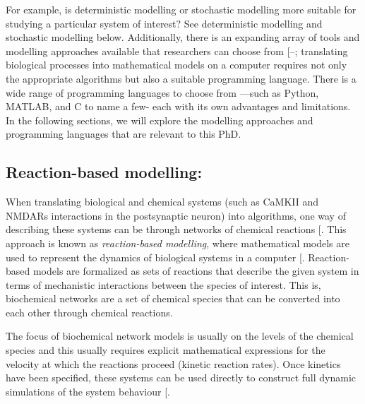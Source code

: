 \documentclass[
  11pt,
  letterpaper,
]{scrreprt}
\begin{document}
For example, is deterministic modelling or stochastic modelling more
suitable for studying a particular system of interest? See deterministic
modelling and stochastic modelling below. Additionally, there is an
expanding array of tools and modelling approaches available that
researchers can choose from
{[}--\citeproc{ref-kohl2011Standards}{266}{]};
translating biological processes into mathematical models on a computer
requires not only the appropriate algorithms but also a suitable
programming language. There is a wide range of programming languages to
choose from ---such as Python, MATLAB, and C to name a few- each with
its own advantages and limitations. In the following sections, we will
explore the modelling approaches and programming languages that are
relevant to this PhD.

\subsection*{Reaction-based modelling:}\label{reaction-based-modelling}

When translating biological and chemical systems (such as CaMKII and
NMDARs interactions in the postsynaptic neuron) into algorithms, one way
of describing these systems can be through networks of chemical
reactions {[}\citeproc{ref-cook2009Programmability}{267}{]}. This
approach is known as \emph{reaction-based modelling}, where mathematical
models are used to represent the dynamics of biological systems in a
computer {[}\citeproc{ref-besozzi2016ReactionBased}{268}{]}.
Reaction-based models are formalized as sets of reactions that describe
the given system in terms of mechanistic interactions between the
species of interest. This is, biochemical networks are a set of chemical
species that can be converted into each other through chemical
reactions.

The focus of biochemical network models is usually on the levels of the
chemical species and this usually requires explicit mathematical
expressions for the velocity at which the reactions proceed (kinetic
reaction rates). Once kinetics have been specified, these systems can be
used directly to construct full dynamic simulations of the system
behaviour {[}\citeproc{ref-cook2009Programmability}{267}{]}.
\end{document}
